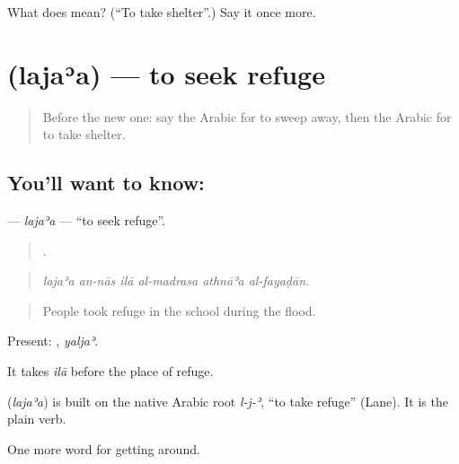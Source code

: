 \begin{tcolorbox}[breakable,colback=teal!4,colframe=teal!35!black,title={Before you move on}]
What does  mean? (\textquotedblleft{}To take shelter\textquotedblright{}.) Say it once more.
\end{tcolorbox}
\section[\texorpdfstring{\ar{لجأ} (lajaʾa)}{لجأ (lajaʾa)}]{ (lajaʾa) — to seek refuge}

\label{lesson:AR-C487-lajaa}



\begin{quote}
Before the new one: say the Arabic for to sweep away, then the Arabic for to take shelter.
\end{quote}

\subsection*{You'll want to know: }
\textbf{} — \emph{lajaʾa} — \textquotedblleft{}to seek refuge\textquotedblright{}.

\begin{quote}
     .
\end{quote}

\begin{quote}
\emph{lajaʾa an-nās ilā al-madrasa athnāʾa al-fayaḍān.}
\end{quote}

\begin{quote}
People took refuge in the school during the flood.
\end{quote}

Present: , \emph{yaljaʾ}.

It takes \emph{ilā} before the place of refuge.

\begin{cousinweb}
\textbf{} (\emph{lajaʾa}) is built on the native Arabic root \emph{l-j-ʾ}, \textquotedblleft{}to take refuge\textquotedblright{} (Lane). It is the plain verb.
\end{cousinweb}

\begin{grammarlens}[title={What you've built}]
One more word for getting around.
\end{grammarlens}

